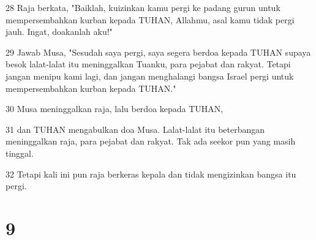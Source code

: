 \par 28 Raja berkata, "Baiklah, kuizinkan kamu pergi ke padang gurun untuk mempersembahkan kurban kepada TUHAN, Allahmu, asal kamu tidak pergi jauh. Ingat, doakanlah aku!"
\par 29 Jawab Musa, "Sesudah saya pergi, saya segera berdoa kepada TUHAN supaya besok lalat-lalat itu meninggalkan Tuanku, para pejabat dan rakyat. Tetapi jangan menipu kami lagi, dan jangan menghalangi bangsa Israel pergi untuk mempersembahkan kurban kepada TUHAN."
\par 30 Musa meninggalkan raja, lalu berdoa kepada TUHAN,
\par 31 dan TUHAN mengabulkan doa Musa. Lalat-lalat itu beterbangan meninggalkan raja, para pejabat dan rakyat. Tak ada seekor pun yang masih tinggal.
\par 32 Tetapi kali ini pun raja berkeras kepala dan tidak mengizinkan bangsa itu pergi.

\chapter{9}


